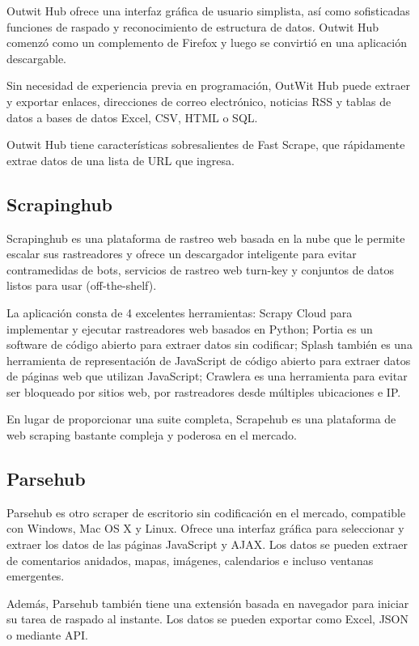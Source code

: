 \documentclass[twocolumn]{article}
\begin{document}
Outwit Hub ofrece una interfaz gráfica de usuario simplista, así como sofisticadas funciones de raspado y reconocimiento de estructura de datos. Outwit Hub comenzó como un complemento de Firefox y luego se convirtió en una aplicación descargable.

Sin necesidad de experiencia previa en programación, OutWit Hub puede extraer y exportar enlaces, direcciones de correo electrónico, noticias RSS y tablas de datos a bases de datos Excel, CSV, HTML o SQL.

Outwit Hub tiene características sobresalientes de Fast Scrape, que rápidamente extrae datos de una lista de URL que ingresa.

\subsection{Scrapinghub}

Scrapinghub es una plataforma de rastreo web basada en la nube que le permite escalar sus rastreadores y ofrece un descargador inteligente para evitar contramedidas de bots, servicios de rastreo web turn-key y conjuntos de datos listos para usar (off-the-shelf).

La aplicación consta de 4 excelentes herramientas: Scrapy Cloud para implementar y ejecutar rastreadores web basados en Python; Portia es un software de código abierto para extraer datos sin codificar; Splash también es una herramienta de representación de JavaScript de código abierto para extraer datos de páginas web que utilizan JavaScript; Crawlera es una herramienta para evitar ser bloqueado por sitios web, por rastreadores desde múltiples ubicaciones e IP.

En lugar de proporcionar una suite completa, Scrapehub es una plataforma de web scraping bastante compleja y poderosa en el mercado.

\subsection{Parsehub}

Parsehub es otro scraper de escritorio sin codificación en el mercado, compatible con Windows, Mac OS X y Linux. Ofrece una interfaz gráfica para seleccionar y extraer los datos de las páginas JavaScript y AJAX. Los datos se pueden extraer de comentarios anidados, mapas, imágenes, calendarios e incluso ventanas emergentes.

Además, Parsehub también tiene una extensión basada en navegador para iniciar su tarea de raspado al instante. Los datos se pueden exportar como Excel, JSON o mediante API.
\end{document}
